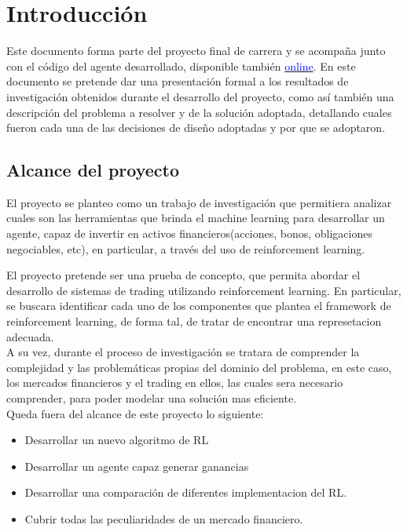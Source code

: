 \chapter{Introducción}

Este documento forma parte del proyecto final de carrera y se acompaña junto con el código del agente desarrollado, disponible también \href{https://github.com/jcaramello/deepQ-stock/}{\textcolor{blue}{online}}. En este documento se pretende dar una presentación formal a los resultados de investigación obtenidos durante el desarrollo del proyecto, como así también una descripción del problema a resolver y de la solución adoptada, detallando cuales fueron cada una de las decisiones de diseño adoptadas y por que se adoptaron.

\section{Alcance del proyecto}
El proyecto se planteo como un trabajo de investigación que permitiera analizar cuales son las herramientas que brinda el machine learning para desarrollar un agente, capaz de invertir en activos financieros(acciones, bonos, obligaciones negociables, etc), en particular, a través  del uso de reinforcement learning.

El proyecto pretende ser una prueba de concepto, que permita abordar el desarrollo de sistemas de trading utilizando reinforcement learning. En particular, se buscara identificar cada uno de los componentes que plantea el framework de reinforcement learning, de forma tal, de tratar de encontrar una represetacion adecuada.
\\
A su vez, durante el proceso de investigación se tratara de comprender la complejidad y las problemáticas propias del dominio del problema, en este caso, los mercados financieros y el trading en ellos, las cuales sera necesario comprender, para poder modelar una solución mas eficiente.
\\
Queda fuera del alcance de este proyecto lo siguiente:

\begin{itemize} %
	\item Desarrollar un nuevo algoritmo de RL
	\item Desarrollar un agente capaz generar ganancias
	\item Desarrollar una comparación de diferentes implementacion del RL.
    \item Cubrir todas las peculiaridades de un mercado financiero.
\end{itemize}

